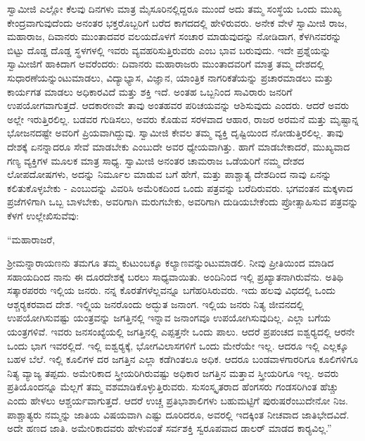  ಸ್ವಾಮೀಜಿ ಎಲ್ಲೋ ಕೆಲವು ದಿನಗಳು ಮಾತ್ರ ಮೈಸೂರಿನಲ್ಲಿದ್ದರೂ ಮುಂದೆ ಅದು ತಮ್ಮ ಸಂಸ್ಥೆಯ ಒಂದು ಮುಖ್ಯ ಕೇಂದ್ರವಾಗುವುದೆಂದು ಅನಂತರ ಭಕ್ತರೊಬ್ಬರಿಗೆ ಬರೆದ ಕಾಗದದಲ್ಲಿ ಹೇಳಿರುವರು. ಅನೇಕ ವೇಳೆ ಸ್ವಾಮೀಜಿ ರಾಜ, ಮಹಾರಾಜ, ದಿವಾನರು ಮುಂತಾದವರ ವಲಯದೊಳಗೆ ಸಂಚಾರ ಮಾಡುವುದನ್ನು ನೋಡಿದಾಗ, ಕೆಳಗಿನವರನ್ನು ಬಿಟ್ಟು ದೊಡ್ಡ ದೊಡ್ಡ ಸ್ಥಳಗಳಲ್ಲಿ ಇವರು ವ್ಯವಹರಿಸುತ್ತಿರುವರು ಎಂಬ ಭಾವ ಬರುವುದು. ಇದೇ ಪ್ರಶ್ನೆಯನ್ನು ಸ್ವಾಮೀಜಿಗೆ ಹಾಕಿದಾಗ ಅವರೆಂದರು: ದಿವಾನರು ಮಹಾರಾಜರು ಮುಂತಾದವರಿಗೆ ಮಾತ್ರ ತಮ್ಮ ದೇಶದಲ್ಲಿ ಸುಧಾರಣೆಯನ್ನುಂಟುಮಾಡಲು, ವಿದ್ಯಾಭ್ಯಾಸ, ವಿಜ್ಞಾನ, ಯಾಂತ್ರಿಕ ನಾಗರಿಕತೆಯನ್ನು ಪ್ರಚಾರಮಾಡಲು ಮತ್ತು ಕಾರ್ಯಗತ ಮಾಡಲು ಅಧಿಕಾರವಿದೆ ಮತ್ತು ಶಕ್ತಿ ಇದೆ. ಅಂತಹ ಒಬ್ಬನಿಂದ ಸಾವಿರಾರು ಜನರಿಗೆ ಉಪಯೋಗವಾಗುತ್ತದೆ. ಆದಕಾರಣವೇ ತಾವು ಅಂತಹವರ ಪರಿಚಯವನ್ನು ಆಶಿಸುವುದು ಎಂದರು. ಆದರೆ ಅವರು ಅಲ್ಲೇ ಇರುತ್ತಿರಲಿಲ್ಲ. ಬಡವರ ಗುಡಿಸಲು, ಅವರು ಕೊಡುವ ಸರಳವಾದ ಆಹಾರ, ರಾಜರ ಅರಮನೆ ಮತ್ತು ಮೃಷ್ಟಾನ್ನ ಭೋಜನದಷ್ಟೇ ಅವರಿಗೆ ಪ್ರಿಯವಾಗಿದ್ದುವು. ಸ್ವಾಮೀಜಿ ಕೇವಲ ತಮ್ಮ ವ್ಯಕ್ತಿ ದೃಷ್ಟಿಯಿಂದ ನೋಡುತ್ತಿರಲಿಲ್ಲ. ತಾವು ದೇಶಕ್ಕೆ ಏನನ್ನಾದರೂ ಸೇವೆ ಮಾಡಬೇಕು ಎಂಬುದೇ ಅವರ ಧ್ಯೇಯವಾಗಿತ್ತು. ಹಾಗೆ ಮಾಡಬೇಕಾದರೆ, ಮುಖ್ಯವಾದ ಗಣ್ಯ ವ್ಯಕ್ತಿಗಳ ಮೂಲಕ ಮಾತ್ರ ಸಾಧ್ಯ. ಸ್ವಾಮೀಜಿ ಅನಂತರ ಚಾಮರಾಜ ಒಡೆಯರಿಗೆ ನಮ್ಮ ದೇಶದ ಲೋಪದೋಷಗಳು, ಅದನ್ನು ನಿರ್ಮೂಲ ಮಾಡುವ ಬಗೆ ಹೇಗೆ, ಮತ್ತು ಪಾಶ್ಚಾತ್ಯ ದೇಶದಿಂದ ನಾವು ಏನನ್ನು ಕಲಿತುಕೊಳ್ಳಬೇಕು - ಎಂಬುದನ್ನು ವಿವರಿಸಿ ಅಮೆರಿಕದಿಂದ ಒಂದು ಪತ್ರವನ್ನು ಬರೆದಿರುವರು. ಭಗವಂತನ ಮಕ್ಕಳಾದ ಪ್ರಜೆಗಳಿಗಾಗಿ ಒಬ್ಬ ಬಾಳಬೇಕು, ಅವರಿಗಾಗಿ ಮರುಗಬೇಕು, ಅವರಿಗಾಗಿ ದುಡಿಯಬೇಕೆಂದು ಪ್ರೋತ್ಸಾಹಿಸುವ ಪತ್ರವನ್ನು ಕೆಳಗೆ ಉಲ್ಲೇಖಿಸುವೆವು: 

 “ಮಹಾರಾಜರೆ, 

 ಶ‍್ರೀಮನ್ನಾರಾಯಣನು ತಮಗೂ ತಮ್ಮ ಕುಟುಂಬಕ್ಕೂ ಕಲ್ಯಾಣವನ್ನುಂಟು\break ಮಾಡಲಿ. ನೀವು ಪ್ರೀತಿಯಿಂದ ಮಾಡಿದ ಸಹಾಯದಿಂದ ನಾನು ಈ ದೂರದೇಶಕ್ಕೆ ಬರಲು ಸಾಧ್ಯವಾಯಿತು. ಅಂದಿನಿಂದ ಇಲ್ಲಿ ಪ್ರಖ್ಯಾತನಾಗಿರುವೆನು. ಅತಿಥಿ ಸತ್ಕಾರಪರರು ಇಲ್ಲಿಯ ಜನರು. ನನ್ನ ಕೊರತೆಗಳೆಲ್ಲವನ್ನೂ ಬಗೆಹರಿಸಿರುವರು. ಇದು ಹಲವು ವಿಧದಲ್ಲಿ ಒಂದು ಆಶ್ಚರ‍್ಯಕರವಾದ ದೇಶ. ಇಲ್ಲ್ಲಿಯ ಜನರೊಂದು ಅದ್ಭುತ ಜನಾಂಗ. ಇಲ್ಲಿಯ ಜನರು ನಿತ್ಯ ಜೀವನದಲ್ಲಿ ಉಪಯೋಗಿಸುವಷ್ಟು ಯಂತ್ರವನ್ನು ಜಗತ್ತಿನಲ್ಲಿ ಇನ್ನಾವ ಜನಾಂಗವೂ ಉಪಯೋಗಿಸುವುದಿಲ್ಲ. ಎಲ್ಲಾ ಬಗೆಯ ಯಂತ್ರಗಳಿವೆ. ಇವರು ಜನಸಂಖ್ಯೆಯಲ್ಲಿ ಜಗತ್ತಿನಲ್ಲಿ ಎಪ್ಪತ್ತನೇ ಒಂದು ಪಾಲು. ಆದರೆ ಪ್ರಪಂಚದ ಐಶ್ವರ‍್ಯದಲ್ಲಿ ಆರನೇ ಒಂದು ಭಾಗ ಇವರಲ್ಲಿದೆ. ಇಲ್ಲಿ ಐಶ್ವರ‍್ಯಕ್ಕೆ, ಭೋಗವಿಲಾಸಗಳಿಗೆ ಒಂದು ಮೇರೆಯೇ ಇಲ್ಲ. ಆದರೂ ಇಲ್ಲಿ ಎಲ್ಲಕ್ಕೂ ಬಹಳ ಬೆಲೆ. ಇಲ್ಲಿ ಕೂಲಿಗಳ ದರ ಜಗತ್ತಿನ ಎಲ್ಲಾ ಕಡೆಗಿಂತಲೂ ಅಧಿಕ. ಆದರೂ ಬಂಡವಾಳಗಾರರಿಗೂ ಕೂಲಿಗಳಿಗೂ ನಿತ್ಯ ವ್ಯಾಜ್ಯ ತಪ್ಪದು. ಅಮೇರಿಕಾದ ಸ್ತ್ರೀಯರಿಗಿರುವಷ್ಟು ಅಧಿಕಾರ ಜಗತ್ತಿನ ಮತ್ತಾವ ಸ್ತ್ರೀಯರಿಗೂ ಇಲ್ಲ. ಅವರು ಪ್ರತಿಯೊಂದನ್ನೂ ಮೆಲ್ಲಗೆ ತಮ್ಮ ವಶಮಾಡಿಕೊಳ್ಳುತ್ತಿರುವರು. ಸುಸಂಸ್ಕೃತರಾದ ಹೆಂಗಸರು ಗಂಡಸರಿಗಿಂತ ಹೆಚ್ಚು ಎಂದು ಹೇಳಲು ಆಶ್ಚರ್ಯವಾಗುತ್ತದೆ. ಆದರೆ ಉಚ್ಚ ಪ್ರತಿಭಾಶಾಲಿಗಳು ಬಹುಮಟ್ಟಿಗೆ ಪುರುಷರೆಂಬುದೇನೋ ನಿಜ. ಪಾಶ್ಚಾತ್ಯರು ನಮ್ಮನ್ನು ಜಾತಿಯ ವಿಷಯವಾಗಿ ಎಷ್ಟು ದೂರಿದರೂ, ಅವರಲ್ಲಿ ಇದಕ್ಕಿಂತ ನೀಚವಾದ ಜಾತಿಭೇದವಿದೆ. ಅದೇ ಹಣದ ಜಾತಿ. ಅಮೇರಿಕಾದವರು ಹೇಳುವಂತೆ ಸರ್ವಶಕ್ತಿ ಸ್ವರೂಪವಾದ ಡಾಲರ್ ಮಾಡದ ಕಾರ‍್ಯವಿಲ್ಲ.” 

